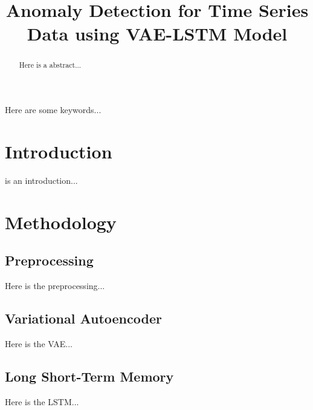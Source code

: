 \documentclass[conference]{IEEEtran}
\begin{document}
\title{Anomaly Detection for Time Series Data using VAE-LSTM Model}

\author{
    \and
    \and
}

\maketitle

\begin{abstract}
Here is a abstract...
\end{abstract}

\begin{IEEEkeywords}
Here are some keywords...
\end{IEEEkeywords}

\section{Introduction}
 is an introduction...

\section{Methodology}
\subsection{Preprocessing}
Here is the preprocessing...

\subsection{Variational Autoencoder}
Here is the VAE...

\subsection{Long Short-Term Memory}
Here is the LSTM...
\end{document}
